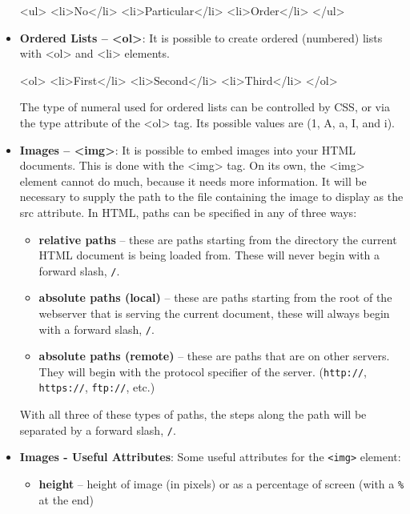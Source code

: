 \documentclass{report}
\begin{document}
\begin{itemize}
\begin{htmlcode}
            <ul>
                <li>No</li>
                <li>Particular</li>
                <li>Order</li>
            </ul>
        \end{htmlcode}
    \item \textbf{Ordered Lists – <ol>}: It is possible to create ordered (numbered) lists with <ol> and <li> elements.
        \bigbreak \noindent 
        \begin{htmlcode}
            <ol>
                <li>First</li>
                <li>Second</li>
                <li>Third</li>
            </ol>
        \end{htmlcode}
        \bigbreak \noindent 
        The type of numeral used for ordered lists can be controlled by CSS, or via the type attribute of the <ol> tag. Its possible values are (1, A, a, I, and i).
    \item \textbf{Images – <img>}: It is possible to embed images into your HTML documents. This is done with the <img> tag. On its own, the <img>
        element cannot do much, because it needs more information. It will be necessary to supply the path to the file
        containing the image to display as the src attribute.
        \bigbreak \noindent 
        In HTML, paths can be specified in any of three ways:
        \begin{itemize}
            \item \textbf{relative paths} – these are paths starting from the directory the current HTML document is being loaded from. These will never begin with a forward slash, \texttt{/}.
            \item \textbf{absolute paths (local)} – these are paths starting from the root of the webserver that is serving the current document, these will always begin with a forward slash, \texttt{/}.
            \item \textbf{absolute paths (remote)} – these are paths that are on other servers. They will begin with the protocol specifier of the server. (\texttt{http://}, \texttt{https://}, \texttt{ftp://}, etc.)
        \end{itemize}
        With all three of these types of paths, the steps along the path will be separated by a forward slash, \texttt{/}.
    \item \textbf{Images - Useful Attributes}: Some useful attributes for the \texttt{<img>} element:
        \begin{itemize}
            \item \textbf{height} – height of image (in pixels) or as a percentage of screen (with a \texttt{\%} at the end)

\end{itemize}
\end{itemize}
\end{document}
